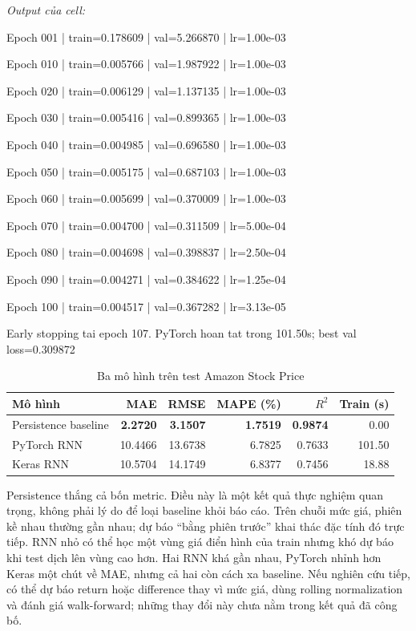 \documentclass[12pt,a4paper]{report}
\begin{document}
\noindent\textit{Output của cell:}
\begin{NotebookOutput}
Epoch 001 | train=0.178609 | val=5.266870 | lr=1.00e-03

Epoch 010 | train=0.005766 | val=1.987922 | lr=1.00e-03

Epoch 020 | train=0.006129 | val=1.137135 | lr=1.00e-03

Epoch 030 | train=0.005416 | val=0.899365 | lr=1.00e-03

Epoch 040 | train=0.004985 | val=0.696580 | lr=1.00e-03

Epoch 050 | train=0.005175 | val=0.687103 | lr=1.00e-03

Epoch 060 | train=0.005699 | val=0.370009 | lr=1.00e-03

Epoch 070 | train=0.004700 | val=0.311509 | lr=5.00e-04

Epoch 080 | train=0.004698 | val=0.398837 | lr=2.50e-04

Epoch 090 | train=0.004271 | val=0.384622 | lr=1.25e-04

Epoch 100 | train=0.004517 | val=0.367282 | lr=3.13e-05

Early stopping tai epoch 107.
PyTorch hoan tat trong 101.50s; best val loss=0.309872
\end{NotebookOutput}

\begin{table}[htbp]\centering\caption{Ba mô hình trên test Amazon Stock Price}\label{tab:amazon-results}
\begin{tabular}{lrrrrr}\toprule
\textbf{Mô hình} & \textbf{MAE} & \textbf{RMSE} & \textbf{MAPE (\%)} & \textbf{$R^2$} & \textbf{Train (s)}\\\midrule
Persistence baseline & \textbf{2.2720} & \textbf{3.1507} & \textbf{1.7519} & \textbf{0.9874} & 0.00\\
PyTorch RNN & 10.4466 & 13.6738 & 6.7825 & 0.7633 & 101.50\\
Keras RNN & 10.5704 & 14.1749 & 6.8377 & 0.7456 & 18.88\\\bottomrule\end{tabular}
\end{table}

Persistence thắng cả bốn metric. Điều này là một kết quả thực nghiệm quan trọng, không phải lý do để loại baseline khỏi báo cáo. Trên chuỗi mức giá, phiên kề nhau thường gần nhau; dự báo ``bằng phiên trước'' khai thác đặc tính đó trực tiếp. RNN nhỏ có thể học một vùng giá điển hình của train nhưng khó dự báo khi test dịch lên vùng cao hơn. Hai RNN khá gần nhau, PyTorch nhỉnh hơn Keras một chút về MAE, nhưng cả hai còn cách xa baseline. Nếu nghiên cứu tiếp, có thể dự báo return hoặc difference thay vì mức giá, dùng rolling normalization và đánh giá walk-forward; những thay đổi này chưa nằm trong kết quả đã công bố.
\end{document}

